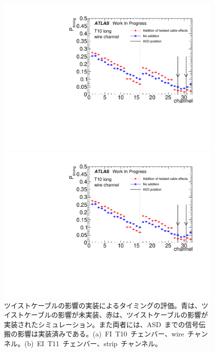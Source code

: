 \begin{figure}[H]
    \begin{minipage}{0.49\hsize}
    \centering   
    \includegraphics[width=\textwidth,page=1]{img/plot/twist.pdf}
    \subcaption{}
    \end{minipage}
    \begin{minipage}{0.49\hsize}
    \centering   
    \includegraphics[width=\textwidth,page=2]{img/plot/twist.pdf}
    \subcaption{}
    \end{minipage}
    \caption[ツイストケーブルの影響の実装によるタイミングの評価]{ツイストケーブルの影響の実装によるタイミングの評価。青は、ツイストケーブルの影響が未実装、赤は、ツイストケーブルの影響が実装されたシミュレーション。また両者には、ASD~までの信号伝搬の影響は実装済みである。(a)~FI~T10~チェンバー、wire~チャンネル。(b)~EI~T11~チェンバー、strip~チャンネル。}
    \label{fig:twist}
\end{figure}


